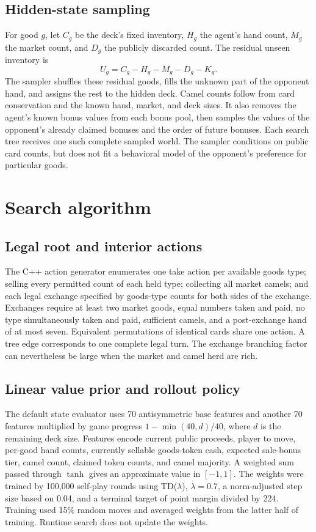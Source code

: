 \documentclass{article}
\begin{document}
\subsection{Hidden-state sampling}

For good $g$, let $C_g$ be the deck's fixed inventory, $H_g$ the agent's hand count, $M_g$ the market count, and $D_g$ the publicly discarded count. The residual unseen inventory is
\begin{equation}
U_g = C_g-H_g-M_g-D_g-K_g.
\label{eq:inventory}
\end{equation}
The sampler shuffles these residual goods, fills the unknown part of the opponent hand, and assigns the rest to the hidden deck. Camel counts follow from card conservation and the known hand, market, and deck sizes. It also removes the agent's known bonus values from each bonus pool, then samples the values of the opponent's already claimed bonuses and the order of future bonuses. Each search tree receives one such complete sampled world. The sampler conditions on public card counts, but does not fit a behavioral model of the opponent's preference for particular goods.

\section{Search algorithm}

\subsection{Legal root and interior actions}

The C++ action generator enumerates one take action per available goods type; selling every permitted count of each held type; collecting all market camels; and each legal exchange specified by goods-type counts for both sides of the exchange. Exchanges require at least two market goods, equal numbers taken and paid, no type simultaneously taken and paid, sufficient camels, and a post-exchange hand of at most seven. Equivalent permutations of identical cards share one action. A tree edge corresponds to one complete legal turn. The exchange branching factor can nevertheless be large when the market and camel herd are rich.

\subsection{Linear value prior and rollout policy}

The default state evaluator uses 70 antisymmetric base features and another 70 features multiplied by game progress $1-\min(40,d)/40$, where $d$ is the remaining deck size. Features encode current public proceeds, player to move, per-good hand counts, currently sellable goods-token cash, expected sale-bonus tier, camel count, claimed token counts, and camel majority. A weighted sum passed through $\tanh$ gives an approximate value in $[-1,1]$. The weights were trained by 100{,}000 self-play rounds using TD($\lambda$), $\lambda=0.7$, a norm-adjusted step size based on 0.04, and a terminal target of point margin divided by 224. Training used 15\% random moves and averaged weights from the latter half of training. Runtime search does not update the weights.
\end{document}

